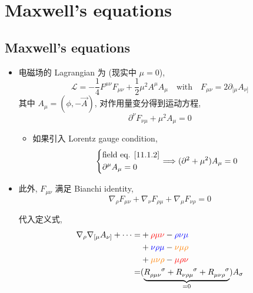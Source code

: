 \chapter{Maxwell's equations}
\section{Maxwell's equations}
\begin{itemize}
	\item 电磁场的 Lagrangian 为 (现实中 $\mu = 0$),
	\begin{equation} \label{11.1.1}
		\mathcal{L} = - \frac{1}{4} F^{\mu \nu} F_{\mu \nu} + \frac{1}{2} \mu^2 A^\mu A_\mu \quad \text{with} \quad F_{\mu \nu} = 2 \partial_{[\mu} A_{\nu]}
	\end{equation}
	其中 $A_\mu = (\phi, - \vec{A})$, 对作用量变分得到运动方程,
	\begin{equation} \label{11.1.2}
		\partial^\nu F_{\nu \mu} + \mu^2 A_\mu = 0
	\end{equation}
	\begin{itemize}
		\item 如果引入 Lorentz gauge condition,
		\begin{equation}
			\begin{dcases}
				\text{field eq. \eqref{11.1.2}} \\
				\partial^\mu A_\mu = 0
			\end{dcases} \Longrightarrow (\partial^2 + \mu^2) A_\mu = 0
		\end{equation}
	\end{itemize}
	
	\item 此外, $F_{\mu \nu}$ 满足 Bianchi identity,
	\begin{equation} \label{11.1.4}
		\nabla_\rho F_{\mu \nu} + \nabla_\nu F_{\rho \mu} + \nabla_\mu F_{\nu \rho} = 0
	\end{equation}
	
	\begin{tcolorbox}[title=calculation:]
		代入定义式,
		\begin{align}
			\nabla_\rho \nabla_{[\mu} A_{\nu]} + \cdots =& + \mathcolor{red}{\rho \mu \nu} - \mathcolor{blue}{\rho \nu \mu} \notag \\
			& + \mathcolor{blue}{\nu \rho \mu} - \mathcolor{orange}{\nu \mu \rho} \notag \\
			& + \mathcolor{orange}{\mu \nu \rho} - \mathcolor{red}{\mu \rho \nu} \notag \\
			=& (\underbrace{\tensor{R}{_{\rho \mu \nu}^\sigma} + \tensor{R}{_{\nu \rho \mu}^\sigma} + \tensor{R}{_{\mu \nu \rho}^\sigma}}_{= 0}) A_\sigma
		\end{align}
	\end{tcolorbox}
	

\end{itemize}
